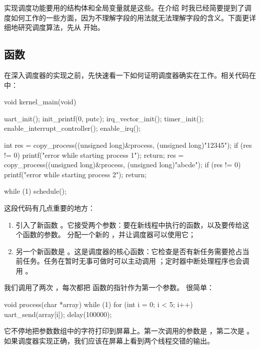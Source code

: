 实现调度功能要用的结构体和全局变量就是这些。在介绍  时我已经简要提到了调度如何工作的一些方面，因为不理解字段的用法就无法理解字段的含义。下面更详细地研究调度算法，先从  开始。

\subsection{ 函数}

在深入调度器的实现之前，先快速看一下如何证明调度器确实在工作。相关代码在  中：

\begin{ccode}
void kernel_main(void)
{
	uart_init();
	init_printf(0, putc);
	irq_vector_init();
	timer_init();
	enable_interrupt_controller();
	enable_irq();

	int res = copy_process((unsigned long)&process, (unsigned long)"12345");
	if (res != 0) {
		printf("error while starting process 1");
		return;
	}
	res = copy_process((unsigned long)&process, (unsigned long)"abcde");
	if (res != 0) {
		printf("error while starting process 2");
		return;
	}

	while (1){
		schedule();
	}
}
\end{ccode}

这段代码有几点重要的地方：

\begin{enumerate}
  \item 引入了新函数 。它接受两个参数：要在新线程中执行的函数，以及要传给这个函数的参数。 分配一个新的 ，并让调度器可以使用它；
  \item 另一个新函数是 。这是调度器的核心函数：它检查是否有新任务需要抢占当前任务。任务在暂时无事可做时可以主动调用 ；定时器中断处理程序也会调用 。
\end{enumerate}

我们调用了两次 ，每次都把  函数的指针作为第一个参数。 很简单：

\begin{ccode}
void process(char *array)
{
	while (1){
		for (int i = 0; i < 5; i++){
			uart_send(array[i]);
			delay(100000);
		}
	}
}
\end{ccode}

它不停地把参数数组中的字符打印到屏幕上。第一次调用的参数是 ，第二次是 。如果调度器实现正确，我们应该在屏幕上看到两个线程交错的输出。

